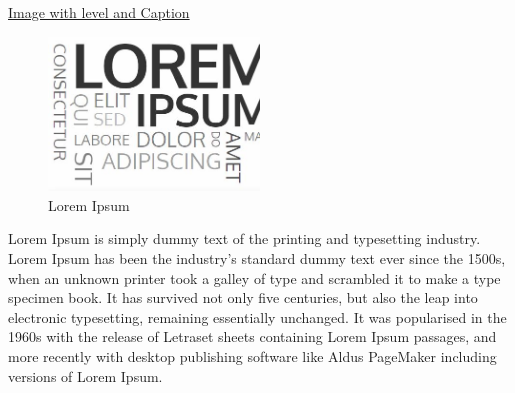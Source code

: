 \documentclass{article}
\begin{document}
\begin{center}
    \Large \underline {Image with level and Caption}
\end{center}

\begin{figure}[h]
    \centering
    \includegraphics[width=0.5\textwidth]{Lorem}
    \caption{Lorem Ipsum} %
    \label{fig:Lorem1} %
\end{figure}
Lorem Ipsum is simply dummy text of the printing and typesetting industry. Lorem Ipsum has been the industry's standard dummy text ever since the 1500s, when an unknown printer took a galley of type and scrambled it to make a type specimen book. It has survived not only five centuries, but also the leap into electronic typesetting, remaining essentially unchanged. It was popularised in the 1960s with the release of Letraset sheets containing Lorem Ipsum passages, and more recently with desktop publishing software like Aldus PageMaker including versions of Lorem Ipsum.
\end{document}
